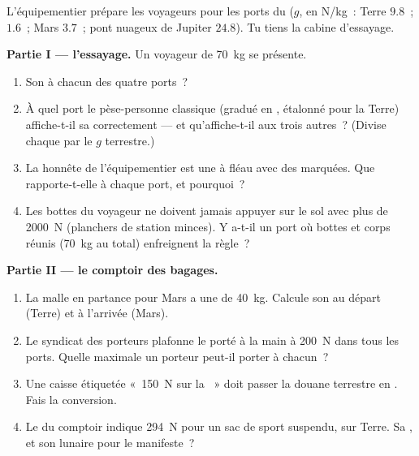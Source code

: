 \begin{problem}\label{pb:g9:weight-vs-mass:1}
L'équipementier prépare les voyageurs pour les ports du  ($g$, en \unit{N/kg}~: Terre $9.8$~;  $1.6$~; Mars
$3.7$~; pont nuageux de Jupiter $24.8$). Tu tiens la cabine
d'essayage.

\medskip\noindent\textbf{Partie I --- l'essayage.}
Un voyageur de  \qty{70}{kg} se présente.
\begin{enumerate}
  \item Son  à chacun des quatre ports~?
  \item À quel port le pèse-personne classique (gradué en
        , étalonné pour la Terre) affiche-t-il sa 
        correctement --- et qu'affiche-t-il aux trois autres~?
        (Divise chaque  par le $g$ terrestre.)
  \item La  honnête de l'équipementier est une  à
        fléau avec des  marquées. Que rapporte-t-elle à
        chaque port, et pourquoi~?
  \item Les bottes du voyageur ne doivent jamais appuyer sur le sol
        avec plus de \qty{2000}{N} (planchers de station minces).
        Y a-t-il un port où bottes et corps réunis (\qty{70}{kg} au
        total) enfreignent la règle~?
\end{enumerate}

\medskip\noindent\textbf{Partie II --- le comptoir des bagages.}
\begin{enumerate}[resume]
  \item La malle en partance pour Mars a une  de \qty{40}{kg}.
        Calcule son  au départ (Terre) et à l'arrivée (Mars).
  \item Le syndicat des porteurs plafonne le \emph{} porté à
        la main à \qty{200}{N} dans tous les ports. Quelle
        \emph{} maximale un porteur peut-il porter à chacun~?
  \item Une caisse étiquetée «~\qty{150}{N} sur la ~» doit
        passer la douane terrestre en . Fais la conversion.
  \item Le  du comptoir indique \qty{294}{N} pour un sac
        de sport suspendu, sur Terre. Sa , et son  lunaire
        pour le manifeste~?
\end{enumerate}


\end{problem}
